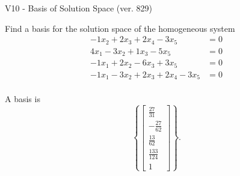 \begin{exercise}
  \begin{exerciseTitle}V10 - Basis of Solution Space (ver. 829)\end{exerciseTitle}
  \begin{exerciseStatement}
    Find a basis for the solution space of the homogeneous system 
\begin{align*}
 -1 x_ 2 + 2 x_ 3 + 2 x_ 4 -3 x_ 5 &= 0  \\ 
  4 x_ 1 -3 x_ 2 + 1 x_ 3 -5 x_ 5 &= 0  \\ 
  -1 x_ 1 + 2 x_ 2 -6 x_ 3 + 3 x_ 5 &= 0  \\ 
  -1 x_ 1 -3 x_ 2 + 2 x_ 3 + 2 x_ 4 -3 x_ 5 &= 0  \\ 
 \end{align*}


 
  \end{exerciseStatement}

  \begin{exerciseAnswer}
   A basis is   
\[\left\{\left[\begin{array}{c}
\frac{27}{31} \\
-\frac{27}{62} \\
\frac{13}{62} \\
\frac{133}{124} \\
1
\end{array}\right]\right\}.\]

  


  \end{exerciseAnswer}
\end{exercise}